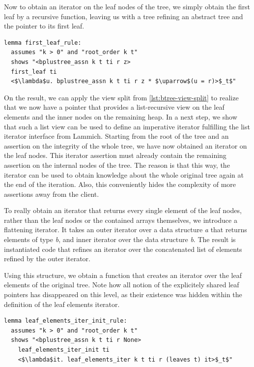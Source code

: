 \documentclass[a4paper,UKenglish,cleveref, autoref, thm-restate]{lipics-v2021}
\begin{document}
Now to obtain an iterator on the leaf nodes of the tree,
we simply obtain the first leaf by a recursive function, leaving
us with a tree refining an abstract tree and the pointer to its first leaf.

\begin{lstlisting}[mathescape=true, language=Isabelle,label=lst:btree-first-leaf]
lemma first_leaf_rule:
  assumes "k > 0" and "root_order k t"
  shows "<bplustree_assn k t ti r z>
  first_leaf ti
  <$\lambda$u. bplustree_assn k t ti r z * $\uparrow$(u = r)>$_t$"
\end{lstlisting}


On the result, we can apply the view split from \autoref{lst:btree-view-split}
to realize that we now have a pointer that provides a list-recursive
view on the leaf elements and the inner nodes on the remaining heap.
In a next step, we show that such a list view can be used
to define an imperative iterator fulfilling the list iterator interface from Lammich. \cite{DBLP:conf/itp/Lammich19}
Starting from the root of the tree and an assertion on the integrity
of the whole tree,
we have now obtained an iterator on the leaf nodes.
This iterator assertion must already contain
the remaining assertion on the internal nodes of the tree.
The reason is that this way, the iterator
can be used to obtain knowledge about the whole
original tree again at the end of the iteration.
Also, this conveniently hides the complexity
of more assertions away from the client.

To really obtain an iterator that returns every single element of the
leaf nodes, rather than the leaf nodes or the contained arrays themselves,
we introduce a flattening iterator.
It takes an outer iterator over a data structure \textit{a} that returns elements of type \textit{b},
and inner iterator over the data structure \textit{b}.
The result is instantiated code that refines an iterator
over the concatenated list of elements refined by the outer iterator.

Using this structure, we obtain a function that creates an iterator
over the leaf elements of the original tree.
Note how all notion of the explicitely shared leaf pointers
has disappeared on this level, as their existence was hidden within the definition
of the leaf elements iterator.

\begin{lstlisting}[mathescape=true, language=Isabelle,label=lst:btree-view-split]
lemma leaf_elements_iter_init_rule:
  assumes "k > 0" and "root_order k t"
  shows "<bplustree_assn k t ti r None>
    leaf_elements_iter_init ti
    <$\lambda$it. leaf_elements_iter k t ti r (leaves t) it>$_t$"
\end{lstlisting}
\end{document}
